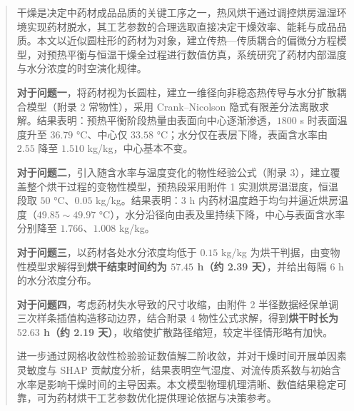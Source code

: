 \maketitle%
\begin{abstract}%

	干燥是决定中药材成品品质的关键工序之一，热风烘干通过调控烘房温湿环境实现药材脱水，其工艺参数的合理选取直接决定干燥效率、能耗与成品品质。本文以近似圆柱形的药材为对象，建立传热—传质耦合的偏微分方程模型，对预热平衡与恒温干燥全过程进行数值仿真，系统研究了药材内部温度与水分浓度的时空演化规律。

	\textbf{对于问题一}，将药材视为长圆柱，建立一维径向非稳态热传导与水分扩散耦合模型（附录 2 常物性），采用 Crank--Nicolson 隐式有限差分法离散求解。结果表明：预热平衡阶段热量由表面向中心逐渐渗透，$1800$ s 时表面温度升至 $36.79$ °C、中心仅 $33.58$ °C；水分仅在表层下降，表面含水率由 $2.55$ 降至 $1.510$ kg/kg，中心基本不变。

	\textbf{对于问题二}，引入随含水率与温度变化的物性经验公式（附录 3），建立覆盖整个烘干过程的变物性模型，预热段采用附件 1 实测烘房温湿度，恒温段取 $50$ °C、$0.05$ kg/kg。结果表明：$3$ h 内药材温度趋于均匀并逼近烘房温度（$49.85\sim49.97$ °C），水分沿径向由表及里持续下降，中心与表面含水率分别降至 $1.766$、$1.008$ kg/kg。

	\textbf{对于问题三}，以药材各处水分浓度均低于 $0.15$ kg/kg 为烘干判据，由变物性模型求解得到\textbf{烘干结束时间约为 $57.45$ h（约 2.39 天）}，并给出每隔 6 h 的水分浓度分布。

	\textbf{对于问题四}，考虑药材失水导致的尺寸收缩，由附件 2 半径数据经保单调三次样条插值构造移动边界，结合附录 4 物性公式求解，得到\textbf{烘干时长为 $52.63$ h（约 2.19 天）}，收缩使扩散路径缩短，较定半径情形略有加快。

	进一步通过网格收敛性检验验证数值解二阶收敛，并对干燥时间开展单因素灵敏度与 SHAP 贡献度分析，结果表明空气湿度、对流传质系数与初始含水率是影响干燥时间的主导因素。本文模型物理机理清晰、数值结果稳定可靠，可为药材烘干工艺参数优化提供理论依据与决策参考。

\end{abstract}
